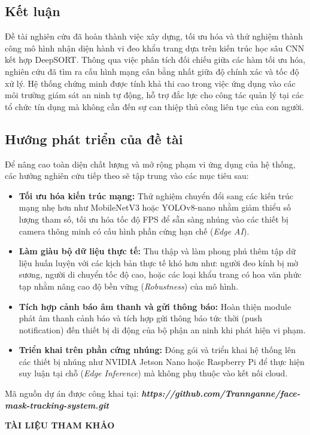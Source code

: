 \documentclass[a4paper,12pt]{article}
\begin{document}
\subsection{Kết luận}
Đề tài nghiên cứu đã hoàn thành việc xây dựng, tối ưu hóa và thử nghiệm thành công mô hình nhận diện hành vi đeo khẩu trang dựa trên kiến trúc học sâu CNN kết hợp DeepSORT. Thông qua việc phân tích đối chiếu giữa các hàm tối ưu hóa, nghiên cứu đã tìm ra cấu hình mạng cân bằng nhất giữa độ chính xác và tốc độ xử lý. Hệ thống chứng minh được tính khả thi cao trong việc ứng dụng vào các môi trường giám sát an ninh tự động, hỗ trợ đắc lực cho công tác quản lý tại các tổ chức tín dụng mà không cần đến sự can thiệp thủ công liên tục của con người.

\subsection{Hướng phát triển của đề tài}
Để nâng cao toàn diện chất lượng và mở rộng phạm vi ứng dụng của hệ thống, các hướng nghiên cứu tiếp theo sẽ tập trung vào các mục tiêu sau:
\begin{itemize}
    \item \textbf{Tối ưu hóa kiến trúc mạng:} Thử nghiệm chuyển đổi sang các kiến trúc mạng nhẹ hơn như MobileNetV3 hoặc YOLOv8-nano nhằm giảm thiểu số lượng tham số, tối ưu hóa tốc độ FPS để sẵn sàng nhúng vào các thiết bị camera thông minh có cấu hình phần cứng hạn chế (\textit{Edge AI}).
    \item \textbf{Làm giàu bộ dữ liệu thực tế:} Thu thập và làm phong phú thêm tập dữ liệu huấn luyện với các kịch bản thực tế khó hơn như: người đeo kính bị mờ sương, người di chuyển tốc độ cao, hoặc các loại khẩu trang có hoa văn phức tạp nhằm nâng cao độ bền vững (\textit{Robustness}) của mô hình.
    \item \textbf{Tích hợp cảnh báo âm thanh và gửi thông báo:} Hoàn thiện module phát âm thanh cảnh báo và tích hợp gửi thông báo tức thời (push notification) đến thiết bị di động của bộ phận an ninh khi phát hiện vi phạm.
    \item \textbf{Triển khai trên phần cứng nhúng:} Đóng gói và triển khai hệ thống lên các thiết bị nhúng như NVIDIA Jetson Nano hoặc Raspberry Pi để thực hiện suy luận tại chỗ (\textit{Edge Inference}) mà không phụ thuộc vào kết nối cloud.
\end{itemize}
Mã nguồn dự án được công khai tại: \textbf{\textit{https://github.com/Trannganne/face-mask-tracking-system.git}}

\newpage
{}
\begin{center}
    {\fontsize{16pt}{20pt}\selectfont \textbf{TÀI LIỆU THAM KHẢO}}
\end{center}
\vspace{0.5cm}
\end{document}

